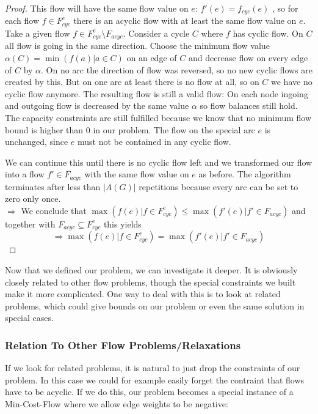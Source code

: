 \begin{proof}
This flow will have the same flow value on $e$: $f'(e)=f_{cyc}(e)$ , so for each flow $f\in F_{cyc}^e$ there is an 
acyclic flow with at least the same flow value on $e$.\\
Take a given flow $f\in F_{cyc}^e\setminus F_{acyc}$. Consider a cycle $C$ where $f$ has cyclic flow. On $C$ all flow 
is going in the same direction. Choose the minimum flow value $\alpha(C)=\min(f(a)|a\in C)$ on an edge of $C$ and 
decrease flow on every edge of $C$ by $\alpha$. On no arc the direction of flow was reversed, so no new cyclic flows
are created by this. But on one arc at least there is no flow at all, so on $C$ we have no cyclic flow anymore. The 
resulting flow is still a valid flow: On each node ingoing and outgoing flow is decreased by the same value $\alpha$ so 
flow balances still hold. The capacity constraints are still fulfilled because we know that no minimum flow bound is 
higher than 0 in our problem. The flow on the special arc $e$ is unchanged, since $e$ must not be contained in any 
cyclic flow.

We can continue this until there is no cyclic flow left and we transformed our flow into a flow $f'\in F_{acyc}$ with 
the same flow value on $e$ as before. The algorithm terminates after less than $|A(G)|$ repetitions because every arc 
can be set to zero only once.\\
$\Rightarrow $ We conclude that $\max(f(e)|f\in F_{cyc}^e)\le \max(f'(e)|f'\in F_{acyc})$ and together with 
$F_{acyc}\subseteq F_{cyc}^e $ this yields
$$\Rightarrow \max(f(e)|f\in F_{cyc}^e)= \max(f'(e)|f'\in F_{acyc}) $$
\end{proof}


Now that we defined our problem, we can investigate it deeper. It is obviously closely related to other flow problems, 
though the special constraints we built make it more complicated. One way to deal with this is to look at related 
problems, which could give bounds on our problem or even the same solution in special cases.

\subsubsection{Relation To Other Flow Problems/Relaxations}

If we look for related problems, it is natural to just drop the constraints of our problem. In this case we could for 
example easily forget the contraint that flows have to be acyclic. If we do this, our problem becomes a special 
instance of a Min-Cost-Flow where we allow edge weights to be negative:

